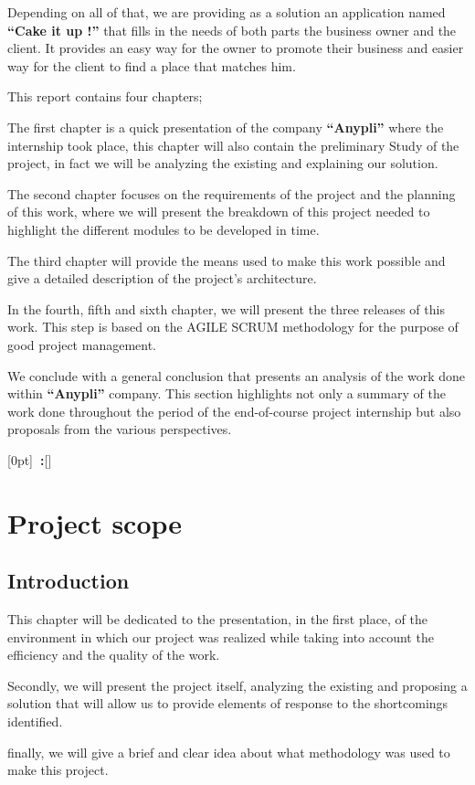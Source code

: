 \documentclass[12pt,a4paper]{report}
\newcommand{\setupname}[1][\chaptername]{
	\titlecontents{chapter}[0pt]{\vspace{1ex}}{\bfseries#1~\thecontentslabel:\quad}{\bfseries}{\bfseries\hfill\contentspage}[]
}
\begin{document}
	Depending on all of that, we are providing as a solution an application named \textbf{``Cake it up !''} that fills in the needs of both parts the business owner and the client. It provides an easy way for the owner to promote their business and easier way for the client to find a place that matches him.\par
	This report contains four chapters;\par
	The first chapter is a quick presentation of the company \textbf{``Anypli''} where the internship took place, this chapter will also contain the preliminary Study of the project, in fact we will be analyzing the existing and explaining our solution.  \par
	The second chapter focuses on the requirements of the project and the planning of this work, where we will present the breakdown of this project needed to highlight the different modules to be developed in time.\par
	The third chapter will provide the means used to make this work possible and give a detailed description of the project's architecture.
	\par
	In the fourth, fifth and sixth chapter, we will present the three releases of this work. This step is based on the AGILE SCRUM methodology for the purpose of good project management.\par
	
	We conclude with a general conclusion that presents an analysis of the work done within \textbf{``Anypli''} company. This section highlights not only a summary of the work done throughout the period of the end-of-course project internship but also proposals from the various perspectives.\par
	
	\pagestyle{fancy}
	\fancyhf{}
	\fancyhead[LE,RO]{\leftmark}
	\fancyfoot[CE,CO]{\thepage}
	\renewcommand{\footrulewidth}{0.4pt}
	\setupname
	\chapter{Project scope }
	\section*{Introduction}
	This chapter will be dedicated to the presentation, in the first place, of the environment in which our project was realized while taking into account the efficiency and the quality of the work.\par
	Secondly, we will present the project itself, analyzing the existing and proposing a solution that will allow us to provide elements of response to the shortcomings identified.\par
	finally, we will give a brief and clear idea about what methodology was used to make this project.
\end{document}

